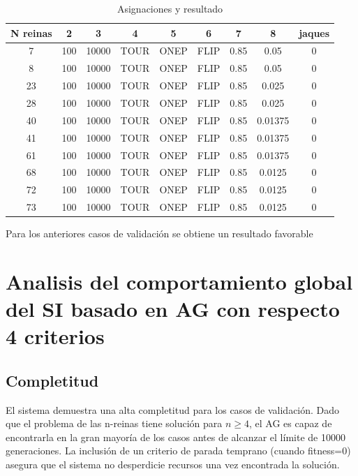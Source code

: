 \documentclass[12pt]{article}
\begin{document}
    \begin{table}[H]
    \centering
    \begin{tabular}{|| c c c c c c c c | c ||}
    \hline
    N reinas & 2 & 3 & 4 & 5 & 6 & 7 & 8 & jaques \\ [0.5ex]
    \hline
    \hline
    7 & 100 & 10000 & TOUR & ONEP & FLIP & 0.85 & 0.05 & 0 \\
    8 & 100 & 10000 & TOUR & ONEP & FLIP & 0.85 & 0.05 & 0 \\
    23 & 100 & 10000 & TOUR & ONEP & FLIP & 0.85 & 0.025 & 0 \\
    28 & 100 & 10000 & TOUR & ONEP & FLIP & 0.85 & 0.025 & 0 \\
    40 & 100 & 10000 & TOUR & ONEP & FLIP & 0.85 & 0.01375 & 0 \\
    41 & 100 & 10000 & TOUR & ONEP & FLIP & 0.85 & 0.01375 & 0 \\
    61 & 100 & 10000 & TOUR & ONEP & FLIP & 0.85 & 0.01375 & 0 \\
    68 & 100 & 10000 & TOUR & ONEP & FLIP & 0.85 & 0.0125 & 0 \\
    72 & 100 & 10000 & TOUR & ONEP & FLIP & 0.85 & 0.0125 & 0 \\
    73 & 100 & 10000 & TOUR & ONEP & FLIP & 0.85 & 0.0125 & 0 \\
    \hline
    \end{tabular}
    \caption{Asignaciones y resultado}
    \end{table}

    Para los anteriores casos de validación se obtiene un resultado favorable

    \section{Analisis del comportamiento global del SI basado en AG con respecto 4 criterios}

    \subsection{Completitud}

   El sistema demuestra una alta completitud para los casos de validación. Dado que el problema de las n-reinas tiene solución para \(n \geq 4\), el AG es capaz de encontrarla en la gran mayoría de los casos antes de alcanzar el límite de 10000 generaciones. La inclusión de un criterio de parada temprano (cuando fitness=0) asegura que el sistema no desperdicie recursos una vez encontrada la solución.
\end{document}
